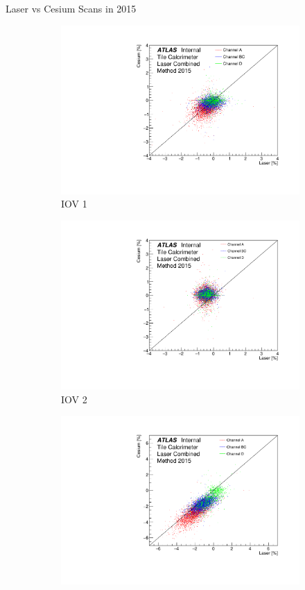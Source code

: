 \documentclass{beamer}
\begin{document}
\begin{frame}{Laser vs Cesium Scans in 2015}
\begin{figure}[H]
\centering
\begin{subfigure} [t] {0.3\textwidth}
\includegraphics[width=\textwidth]{scatter_all_iov1.pdf}
\caption{IOV 1}
\end{subfigure}
\begin{subfigure} [t] {0.3\textwidth}
\includegraphics[width=\textwidth]{scatter_all_iov2.pdf}
\caption{IOV 2}
\end{subfigure}
\begin{subfigure} [t] {0.3\textwidth}
\includegraphics[width=\textwidth]{scatter_all_iov3.pdf}

\end{subfigure}
\end{figure}
\end{frame}
\end{document}
